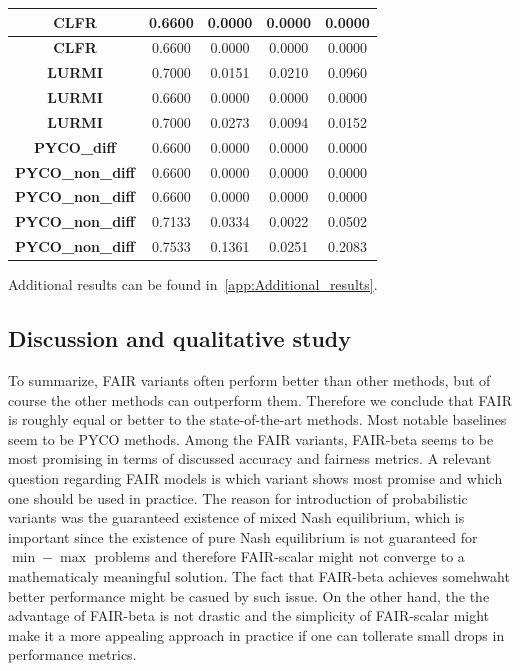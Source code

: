 \documentclass[preprint,12pt]{elsarticle}
\begin{document}
\begin{table}
\begin{tabular}{|c|c|c|c|c|}
		\textbf{CLFR}            & 0.6600       & 0.0000       & 0.0000       & 0.0000        \\ \hline
		\textbf{CLFR}            & 0.6600       & 0.0000       & 0.0000       & 0.0000        \\ \hline
		\textbf{LURMI}           & 0.7000       & 0.0151       & 0.0210       & 0.0960        \\ \hline
		\textbf{LURMI}           & 0.6600       & 0.0000       & 0.0000       & 0.0000        \\ \hline
		\textbf{LURMI}           & 0.7000       & 0.0273       & 0.0094       & 0.0152        \\ \hline
		\textbf{PYCO\_diff}      & 0.6600       & 0.0000       & 0.0000       & 0.0000        \\ \hline
		\textbf{PYCO\_non\_diff} & 0.6600       & 0.0000       & 0.0000       & 0.0000        \\ \hline
		\textbf{PYCO\_non\_diff} & 0.6600       & 0.0000       & 0.0000       & 0.0000        \\ \hline
		\textbf{PYCO\_non\_diff} & 0.7133       & 0.0334       & 0.0022       & 0.0502        \\ \hline
		\textbf{PYCO\_non\_diff} & 0.7533       & 0.1361       & 0.0251       & 0.2083        \\ \hline
	\end{tabular}
	\label{tab:Ger-sex}%
\end{table}

Additional results can be found in~\ref{app:Additional_results}. 

\subsection{Discussion and qualitative study}

To summarize, FAIR variants often perform better than other methods, but of course the other methods can outperform them. Therefore we conclude that FAIR is roughly equal or better to the state-of-the-art methods. Most notable baselines seem to be PYCO methods. Among the FAIR variants, FAIR-beta seems to be most promising in terms of discussed accuracy and fairness metrics.
A relevant question regarding FAIR models is which variant shows most promise and which one should be used in practice. The reason for introduction of probabilistic variants was the guaranteed existence of mixed Nash equilibrium, which is important since the existence of pure Nash equilibrium is not guaranteed for $\min-\max$ problems and therefore FAIR-scalar might not converge to a mathematicaly meaningful solution. The fact that FAIR-beta achieves somehwaht better performance might be casued by such issue. On the other hand, the the advantage of FAIR-beta is not drastic and the simplicity of FAIR-scalar might make it a more appealing approach in practice if one can tollerate small drops in performance metrics. 
\end{document}
